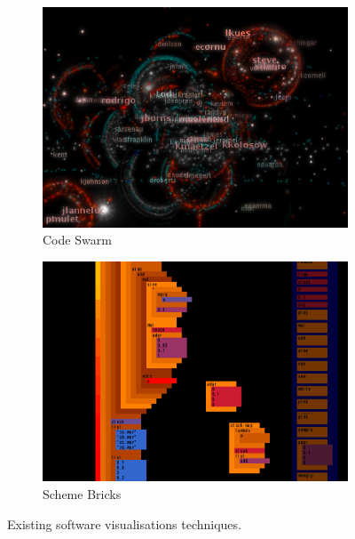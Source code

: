 \begin{figure}
\begin{subfigure}{.5\textwidth}
  \includegraphics[width=.95\linewidth]{../images/code-visualisations/code-swarm.png}
  \caption{Code Swarm \protect\cite{Ogawa2012}}
  \label{fig:code-swarm}
\end{subfigure}%
\begin{subfigure}{.5\textwidth}
  \includegraphics[width=.95\linewidth]{../images/code-visualisations/scheme-bricks.png}
  \caption{Scheme Bricks \protect\cite{McLean2010a}}
  \label{fig:scheme-bricks}
\end{subfigure}

\caption[Existing software visualisations techniques]{Existing software visualisations techniques.}
\label{fig:code-visualisations}
\end{figure}